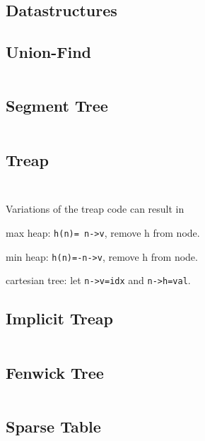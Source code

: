 \documentclass[8pt,a4paper,landscape,oneside]{amsart}
\newenvironment{itemize_compact}
{ \begin{itemize}[leftmargin=.5cm]
    \setlength{\itemsep}{0pt}
    \setlength{\parskip}{0pt}
    \setlength{\parsep}{0pt}     }
{ \end{itemize}                  }
\begin{document}
	\newpage
	\begin{multicols*}{4}		
		\section{Datastructures}
		\subsection{Union-Find}
		\inputminted[firstline=9,lastline=19]{c++}{_code/datastructures/union_find.cpp}
		\subsection{Segment Tree}
		\inputminted[firstline=14,lastline=52]{c++}{_code/datastructures/segment_tree.cpp}
		\vfill\null
		\columnbreak
		\subsection{Treap}
		\inputminted[firstline=16,lastline=67]{c++}{_code/datastructures/treap.cpp}
		\vfill\null
		\columnbreak
		\inputminted[firstline=68,lastline=115]{c++}{_code/datastructures/treap.cpp}
		\noindent
		Variations of the treap code can result in
		\begin{itemize_compact}
			\item max heap: \texttt{h(n)= n->v}, remove h from node.
			\item min heap: \texttt{h(n)=-n->v}, remove h from node.
			\item cartesian tree: let \texttt{n->v=idx} and \texttt{n->h=val}.
		\end{itemize_compact}
		\vfill\null
		\columnbreak
		\subsection{Implicit Treap}
		\inputminted[firstline=16,lastline=69]{c++}{_code/datastructures/implicit_treap.cpp}
		\vfill\null
	\end{multicols*}
	\newpage
	\begin{multicols*}{4}
		\subsection{Fenwick Tree}
		\inputminted[firstline=14,lastline=32]{c++}{_code/datastructures/fenwick_tree.cpp}
		\subsection{Sparse Table}
		\inputminted[firstline=15,lastline=23]{c++}{_code/datastructures/sparse_table.cpp}
		\vfill\null
	\end{multicols*}
\end{document}
